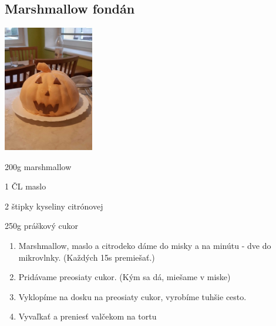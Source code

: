 \setcounter{step}{0}
\subsection{Marshmallow fondán}

\begin{ingredient}
\includegraphics[height=5.5cm]{images/pistkot_krem_salko}
\def\portions{4}%

\begin{main}
	\item 200g marshmallow
	\item 1 ČL maslo
	\item 2 štipky kyseliny citrónovej
	\item 250g práškový cukor
\end{main}
\end{ingredient}
\begin{recipe}

\begin{enumerate}

\item{Marshmallow, maslo a citrodeko dáme do misky a na minútu - dve do mikrovlnky. (Každých 15s premiešať.)}
\item{Pridávame preosiaty cukor. (Kým sa dá, miešame v miske)}
\item{Vyklopíme na dosku na preosiaty cukor, vyrobíme tuhšie cesto.}	
\item{Vyvaľkať a preniesť valčekom na tortu}

\end{enumerate}
\end{recipe}

\begin{notes}

\end{notes}
\clearpage	